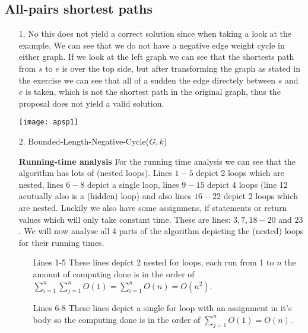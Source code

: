 \documentclass{article}
\begin{document}
\subsection*{All-pairs shortest paths}
\begin{itemize}
\item[1.] No this does not yield a correct solution since when taking a look at the example. We can see that we do not have a negative edge weight cycle in either graph. If we look at the left graph we can see that the shortests path from $s$ to $e$ is over the top side, but after transforming the graph as stated in the exercise we can see that all of a sudden the edge directely between $s$ and $e$ is taken, which is not the shortest path in the original graph, thus the proposal does not yield a valid solution.

\texttt{[image: apsp1]}

\item[2.]
Bounded-Length-Negative-Cycle($G,k$) 
\begin{algorithmic}[1]
	\ENDFOR
\ENDFOR
{}
\ENDFOR
{}
		\ENDFOR
	\ENDFOR
\ENDFOR
{}
			\RETURN{\TRUE}
		\ENDIF
	\ENDFOR
\ENDFOR
\RETURN{\FALSE}
\end{algorithmic}

\textbf{Running-time analysis}
For the running time analysis we can see that the algorithm has lots of (nested loops). Lines $1-5$ depict 2 loops which are nested, lines $6-8$ depict a single loop, lines $9-15$ depict 4 loops (line 12 acutually also is a (hidden) loop) and also lines $16-22$ depict 2 loops which are nested. Luckily we also have some assignmens, if statements or return values which will only take constant time. These are lines: $3,7, 18-20$ and $23$. We will now analyse all 4 parts of the algorithm depicting the (nested) loops for their running times.

\begin{itemize}
\item[Lines 1-5] These lines depict 2 nested for loops, each run from 1 to $n$ the amount of computing done is in the order of $\sum_{i=1}^n{\sum_{j=1}^n{O(1)}}=\sum_{i=1}^n{O(n)}=O(n^2)$.

\item[Lines 6-8] These lines depict a single for loop with an assignment in it's body so the computing done is in the order of $\sum_{j=1}^n{O(1)}=O(n)$.


\end{itemize}
\end{itemize}
\end{document}
